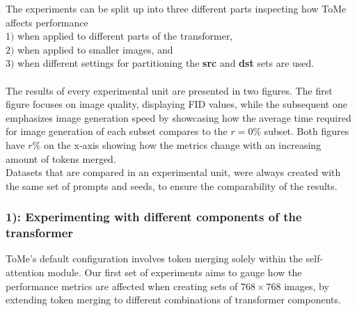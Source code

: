 The experiments can be split up into three different parts inspecting how ToMe affects performance\\ \(1)\) when applied to different parts of the transformer,\\ \(2)\) when applied to smaller images, and\\ \(3)\) when different settings for partitioning the \textbf{src} and \textbf{dst} sets are used.\\
\\
The results of every experimental unit are presented in two figures. The first figure focuses on image quality, displaying FID values, while the subsequent one emphasizes image generation speed by showcasing how the average time required for image generation of each subset compares to the \(r=0\%\) subset.
Both figures have \(r\%\) on the x-axis showing how the metrics change with an increasing amount of tokens merged.\\
Datasets that are compared in an experimental unit, were always created with the same set of prompts and seeds, to ensure the comparability of the results.



\subsubsection*{1): Experimenting with different components of the transformer}
ToMe's default configuration involves token merging solely within the self-attention module.
Our first set of experiments aims to gauge how the performance metrics are affected when creating sets of $768 \times 768$ images, by extending token merging to different combinations of transformer components.




